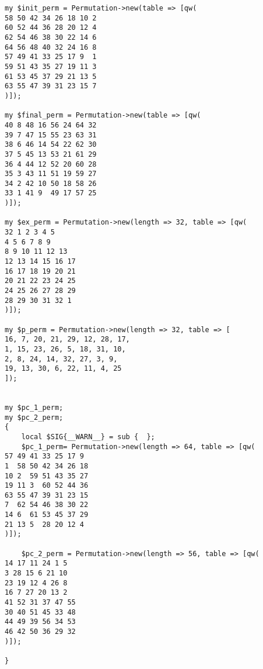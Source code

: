 \documentclass[10pt,a4paper]{article}
\begin{document}
\begin{lstlisting}
my $init_perm = Permutation->new(table => [qw(
58 50 42 34 26 18 10 2
60 52 44 36 28 20 12 4
62 54 46 38 30 22 14 6
64 56 48 40 32 24 16 8
57 49 41 33 25 17 9  1
59 51 43 35 27 19 11 3
61 53 45 37 29 21 13 5
63 55 47 39 31 23 15 7
)]);

my $final_perm = Permutation->new(table => [qw(
40 8 48 16 56 24 64 32
39 7 47 15 55 23 63 31
38 6 46 14 54 22 62 30
37 5 45 13 53 21 61 29
36 4 44 12 52 20 60 28
35 3 43 11 51 19 59 27
34 2 42 10 50 18 58 26
33 1 41 9  49 17 57 25
)]);

my $ex_perm = Permutation->new(length => 32, table => [qw(
32 1 2 3 4 5
4 5 6 7 8 9
8 9 10 11 12 13
12 13 14 15 16 17
16 17 18 19 20 21
20 21 22 23 24 25
24 25 26 27 28 29
28 29 30 31 32 1
)]);

my $p_perm = Permutation->new(length => 32, table => [
16, 7, 20, 21, 29, 12, 28, 17,
1, 15, 23, 26, 5, 18, 31, 10,
2, 8, 24, 14, 32, 27, 3, 9,
19, 13, 30, 6, 22, 11, 4, 25
]);


my $pc_1_perm;
my $pc_2_perm;
{
    local $SIG{__WARN__} = sub {  };
    $pc_1_perm= Permutation->new(length => 64, table => [qw(
57 49 41 33 25 17 9
1  58 50 42 34 26 18
10 2  59 51 43 35 27
19 11 3  60 52 44 36
63 55 47 39 31 23 15
7  62 54 46 38 30 22
14 6  61 53 45 37 29
21 13 5  28 20 12 4
)]);

    $pc_2_perm = Permutation->new(length => 56, table => [qw(
14 17 11 24 1 5
3 28 15 6 21 10
23 19 12 4 26 8
16 7 27 20 13 2
41 52 31 37 47 55
30 40 51 45 33 48
44 49 39 56 34 53
46 42 50 36 29 32
)]);

}


\end{lstlisting}
\end{document}
